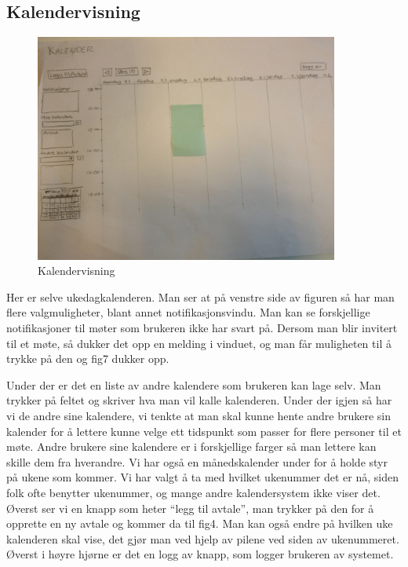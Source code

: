 \subsection{Kalendervisning}
\begin{figure}[ht!]
\includegraphics[width=100mm]{fig3.jpg}
\caption{Kalendervisning}
\end{figure}
Her er selve ukedagkalenderen. Man ser at på venstre side av figuren så har man flere valgmuligheter, blant annet notifikasjonsvindu. Man kan se forskjellige notifikasjoner til møter som brukeren ikke har svart på. Dersom man blir invitert til et møte, så dukker det opp en melding i vinduet, og man får muligheten til å trykke på den og fig7 dukker opp. 

Under der er det en liste av andre kalendere som brukeren kan lage selv. Man trykker på feltet og skriver hva man vil kalle kalenderen. Under der igjen så har vi de andre sine kalendere, vi tenkte at man skal kunne hente andre brukere sin kalender for å lettere kunne velge ett tidspunkt som passer for flere personer til et møte. Andre brukere sine kalendere er i forskjellige farger så man lettere kan skille dem fra hverandre. Vi har også en månedskalender under for å holde styr på ukene som kommer. Vi har valgt å ta med hvilket ukenummer det er nå, siden folk ofte benytter ukenummer, og mange andre kalendersystem ikke viser det. Øverst ser vi en knapp som heter “legg til avtale”, man trykker på den for å opprette en ny avtale og kommer da til fig4. Man kan også endre på hvilken uke kalenderen skal vise, det gjør man ved hjelp av pilene ved siden av ukenummeret. Øverst i høyre hjørne er det en logg av knapp, som logger brukeren av systemet.

\newpage

